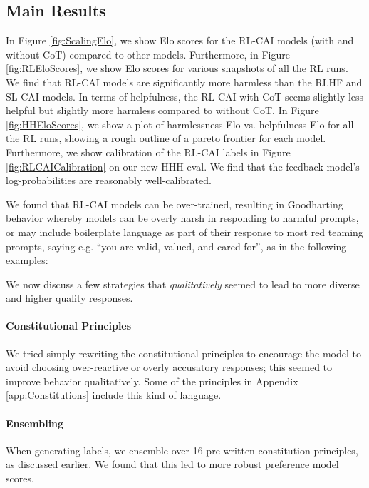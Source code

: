 \subsection{Main Results}
\label{sec:RLCAIResults}

In Figure \ref{fig:ScalingElo}, we show Elo scores for the RL-CAI models (with and without CoT) compared to other models. Furthermore, in Figure \ref{fig:RLEloScores}, we show Elo scores for various snapshots of all the RL runs. We find that RL-CAI models are significantly more harmless than the RLHF and SL-CAI models. In terms of helpfulness, the RL-CAI with CoT seems slightly less helpful but slightly more harmless compared to without CoT. In Figure \ref{fig:HHEloScores}, we show a plot of harmlessness Elo vs. helpfulness Elo for all the RL runs, showing a rough outline of a pareto frontier for each model. Furthermore, we show calibration of the RL-CAI labels in Figure \ref{fig:RLCAICalibration} on our new HHH eval. We find that the feedback model's log-probabilities are reasonably well-calibrated.

We found that  RL-CAI models can be over-trained, resulting in Goodharting behavior \cite{ScalingLawsPM} whereby  models can be overly harsh in responding to harmful prompts, or may include boilerplate language  as part of their response to most red teaming prompts,  saying e.g. ``you are valid, valued, and cared for'', as in the following examples:

We now discuss a few strategies that \emph{qualitatively} seemed to lead to more diverse and higher quality responses.

\paragraph{Constitutional Principles} We tried simply rewriting the constitutional principles to encourage the model to avoid choosing over-reactive or overly accusatory responses; this seemed to improve behavior qualitatively.  Some of the principles in Appendix \ref{app:Constitutions} include this kind of language.

\paragraph{Ensembling} When generating labels, we ensemble over 16 pre-written constitution principles, as discussed earlier. We found that this led to more robust preference model scores.

